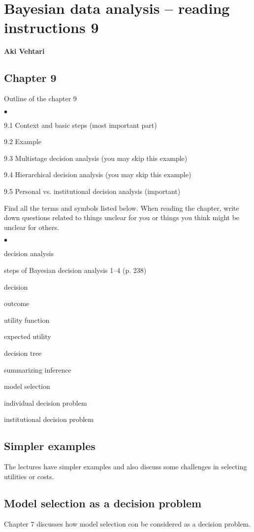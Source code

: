 \documentclass[a4paper,11pt,english]{article}
\begin{document}
\thispagestyle{empty}

\section*{Bayesian data analysis -- reading instructions 9} 
\smallskip
{\bf Aki Vehtari}
\smallskip

\subsection*{Chapter 9}

Outline of the chapter 9
\begin{list}{$\bullet$}{\parsep=0pt\itemsep=2pt}
\item 9.1 Context and basic steps (most important part)
\item 9.2 Example
\item 9.3 Multistage decision analysis (you may skip this example)
\item 9.4 Hierarchical decision analysis (you may skip this example)
\item 9.5 Personal vs. institutional decision analysis (important)
\end{list}

Find all the terms and symbols listed below. When reading the chapter,
write down questions related to things unclear for you or things you
think might be unclear for others. 
\begin{list}{$\bullet$}{\parsep=0pt\itemsep=2pt}
\item decision analysis
\item steps of Bayesian decision analysis 1--4 (p. 238)
\item decision
\item outcome
\item utility function
\item expected utility
\item decision tree
\item summarizing inference
\item model selection
\item individual decision problem
\item institutional decision problem
\end{list}

\subsection*{Simpler examples}

The lectures have simpler examples and also discuss some challenges in
selecting utilities or costs.

\subsection*{Model selection as a decision problem}

Chapter 7 discusses how model selection con be considered as a
decision problem.
\end{document}

